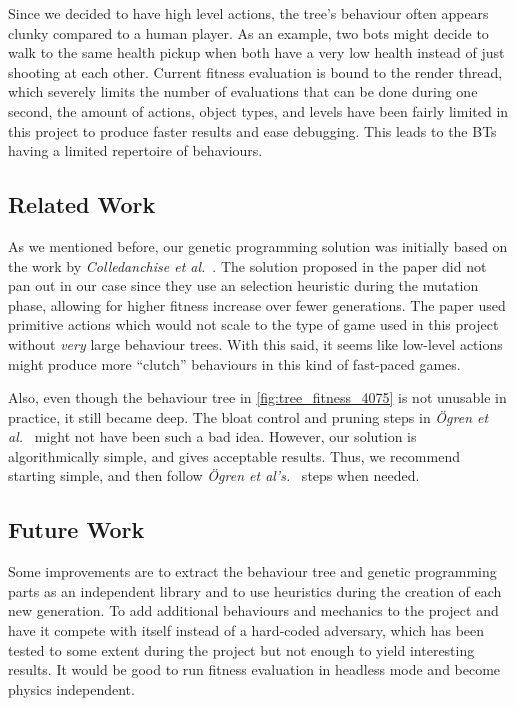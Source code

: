 \documentclass[a4paper, twocolumn]{article}
\begin{document}
    Since we decided to have high level actions, the tree's behaviour often appears clunky compared to a human player. As an example, two bots might decide to walk to the same health pickup when both have a very low health instead of just shooting at each other. Current fitness evaluation is bound to the render thread, which severely limits the number of evaluations that can be done during one second, the amount of actions, object types, and levels have been fairly limited in this project to produce faster results and ease debugging. This leads to the BTs having a limited repertoire of behaviours.

    \vspace{-0.5em}

    \subsection*{Related Work}

    As we mentioned before, our genetic programming solution was initially based on the work by \emph{Colledanchise et al.}~\cite{colledanchise2015learning}. The solution proposed in the paper did not pan out in our case since they use an selection heuristic during the mutation phase, allowing for higher fitness increase over fewer generations. The paper used primitive actions which would not scale to the type of game used in this project without \emph{very} large behaviour trees. With this said, it seems like low-level actions might produce more ``clutch'' behaviours in this kind of fast-paced games. 

    Also, even though the behaviour tree in \cref{fig:tree_fitness_4075} is not unusable in practice, it still became deep. The bloat control and pruning steps in \emph{{\"O}gren et al.}~\cite{colledanchise2015learning} might not have been such a bad idea. However, our solution is algorithmically simple, and gives acceptable results. Thus, we recommend starting simple, and then follow \emph{{\"O}gren et al's.}~\cite{colledanchise2015learning} steps when needed.

    \vspace{-0.5em}

    \subsection*{Future Work}

    Some improvements are to extract the behaviour tree and genetic programming parts as an independent library and to use heuristics during the creation of each new generation. To add additional behaviours and mechanics to the project and have it compete with itself instead of a hard-coded adversary, which has been tested to some extent during the project but not enough to yield interesting results. It would be good to run fitness evaluation in headless mode and become physics independent.
\end{document}
